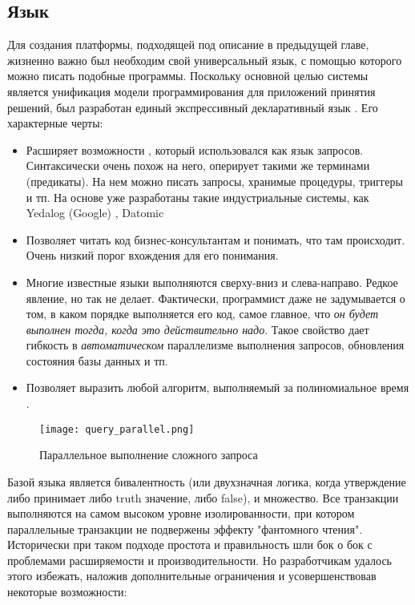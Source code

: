 \subsection{Язык \logiql}
\label{sec:technology:logiql}

Для создания платформы, подходящей под описание в предыдущей главе, жизненно важно был необходим свой универсальный язык, с помощью которого можно писать подобные программы. Поскольку основной целью системы является унификация модели программирования для приложений принятия решений, был  разработан единый экспрессивный декларативный  язык \logiql. Его характерные черты:

\begin{itemize}
  \item Расширяет возможности \datalog, который использовался как язык запросов. Синтаксически очень похож на него, оперирует такими же терминами (предикаты). На нем можно писать запросы, хранимые процедуры, триггеры и тп. На основе \datalog уже разработаны такие индустриальные системы, как Yedalog (Google) \cite{yedalog}, Datomic \cite{datomic}
  \item Позволяет читать код бизнес-консультантам и понимать, что там происходит. Очень низкий порог вхождения для его понимания.
  \item Многие известные языки выполняются сверху-вниз и слева\--\-на\-пра\-во. Редкое явление, но \logiql так не делает. Фактически, программист даже не задумывается о том, в каком порядке выполняется его код, самое главное, что \emph{он будет выполнен тогда, когда это действительно надо}. Такое свойство дает гибкость в \emph{автоматическом} параллелизме выполнения запросов, обновления состояния базы данных и тп.
  \item Позволяет выразить любой алгоритм, выполняемый за полиномиальное время \cite{languages_for_np_problems}.
\end{itemize}

\begin{figure}
	\centering
	\texttt{[image: query\_parallel.png]}
	\caption{Параллельное выполнение сложного запроса \cite{query_parallel_execution}}
	\label{fig:technology:logiql:query_parallel}
\end{figure}

Базой языка является бивалентность (или двухзначная логика, когда утверждение либо принимает либо truth значение, либо false), и множество. Все транзакции выполняются на самом высоком уровне изолированности, при котором параллельные транзакции не подвержены эффекту "фантомного чтения". Исторически при таком подходе простота и правильность шли бок о бок с проблемами расширяемости и производительности. Но разработчикам \logiql удалось этого избежать, наложив дополнительные ограничения и усовершенствовав некоторые возможности:

